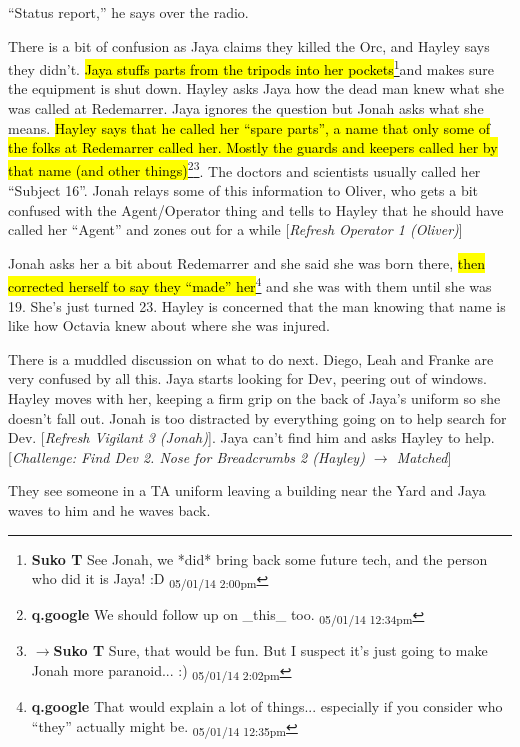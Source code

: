``Status report,'' he says over the radio.  



There is a bit of confusion as Jaya claims they killed the Orc, and Hayley says they didn't.  \hl{Jaya stuffs parts from the tripods into her pockets}\footnote{\textbf{Suko T }See Jonah, we *did* bring back some future tech, and the person who did it is Jaya! :D \textsubscript{05/01/14 2:00pm}}and makes sure the equipment is shut down.  Hayley asks Jaya how the dead man knew what she was called at Redemarrer.  Jaya ignores the question but Jonah asks what she means.  \hl{Hayley says that he called her ``spare parts'', a name that only some of the folks at Redemarrer called her.  Mostly the guards and keepers called her by that name (and other things)}\footnote{\textbf{q.google }We should follow up on \_this\_ too. \textsubscript{05/01/14 12:34pm}}\footnote{$\rightarrow$\textbf{Suko T }Sure, that would be fun.  But I suspect it's just going to make Jonah more paranoid... :) \textsubscript{05/01/14 2:02pm}}.  The doctors and scientists usually called her ``Subject 16''.  Jonah relays some of this information to Oliver, who gets a bit confused with the Agent/Operator thing and tells to Hayley that he should have called her ``Agent'' and zones out for a while {[}\textit{Refresh Operator 1 (Oliver)}{]}



Jonah asks her a bit about Redemarrer and she said she was born there, \hl{then corrected herself to say they ``made'' her}\footnote{\textbf{q.google }That would explain a lot of things... especially if you consider who ``they'' actually might be. \textsubscript{05/01/14 12:35pm}} and she was with them until she was 19.  She's just turned 23.   Hayley is concerned that the man knowing that name is like how Octavia knew about where she was injured. 



There is a muddled discussion on what to do next.  Diego, Leah and Franke are very confused by all this.  Jaya starts looking for Dev, peering out of windows.  Hayley moves with her, keeping a firm grip on the back of Jaya's uniform so she doesn't fall out.  Jonah is too distracted by everything going on to help search for Dev. {[}\textit{Refresh Vigilant 3 (Jonah)}{]}.  Jaya can't find him and asks Hayley to help.  {[}\textit{Challenge: Find Dev 2. Nose for Breadcrumbs 2 (Hayley) $\rightarrow$ Matched}{]}



They see someone in a TA uniform leaving a building near the Yard and Jaya waves to him and he waves back.



